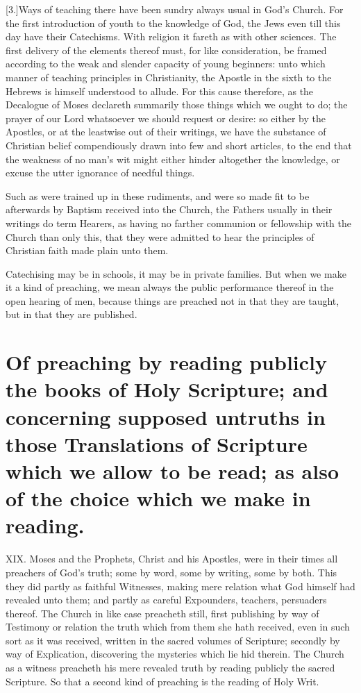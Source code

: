 [3.]Ways of teaching there have been sundry always usual in God’s Church. For the first introduction of youth to the knowledge of God, the Jews even till this day have their Catechisms. With religion it fareth as with other sciences.  The first delivery of the elements thereof must, for like consideration,
 be framed according to the weak and slender capacity of young beginners: unto which manner of teaching principles in Christianity, the Apostle in the sixth to the Hebrews is himself understood to allude. For this cause therefore, as the Decalogue of Moses declareth summarily those things which we ought to do; the prayer of our Lord whatsoever we should request or desire: so either by the Apostles, or at the leastwise out of their writings, we have the substance of Christian belief compendiously drawn into few and short articles, to the end that the weakness of no man’s wit might either hinder altogether the knowledge, or excuse the utter ignorance of needful things.

Such as were trained up in these rudiments, and were so made fit to be afterwards by Baptism received into the Church,  the Fathers usually in their writings do term Hearers,
 as having no farther communion or fellowship with the Church than only this, that they were admitted to hear the principles of Christian faith made plain unto them.

Catechising may be in schools, it may be in private families. But when we make it a kind of preaching, we mean always the public performance thereof in the open hearing of men, because things are preached not in that they are taught, but in that they are published.


\section*{Of preaching by reading publicly the books of Holy Scripture; and concerning supposed untruths in those Translations of Scripture which we allow to be read; as also of the choice which we make in reading.}
XIX. Moses and the Prophets, Christ and his Apostles, were in their times all preachers of God’s truth; some by word, some by writing, some by both. This they did partly as faithful Witnesses, making mere relation what God himself had revealed unto them; and partly as careful Expounders, teachers, persuaders thereof. The Church in like case preacheth still, first publishing by way of Testimony or relation the truth which from them she hath received, even in such sort as it was received, written in the sacred volumes of Scripture; secondly by way of Explication, discovering the mysteries which lie hid therein. The Church as a witness preacheth his mere revealed truth by reading publicly the sacred Scripture. So that a second kind of preaching is the reading of Holy Writ.

